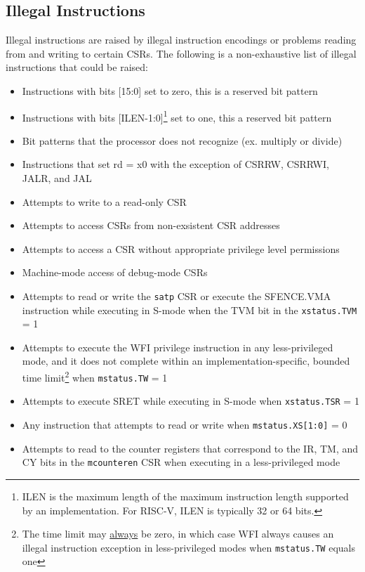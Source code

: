 \documentclass[12pt]{article}
\begin{document}
\subsection{Illegal Instructions}
Illegal instructions are raised by illegal instruction encodings or problems reading from and writing to certain CSRs. The following is a non-exhaustive list of illegal instructions that could be raised:
\begin{itemize}
    \item Instructions with bits [15:0] set to zero, this is a reserved bit pattern
    \item Instructions with bits [ILEN-1:0]\footnote[2]{ILEN is the maximum length of the maximum instruction length supported by an implementation. For RISC-V, ILEN is typically 32 or 64 bits.} set to one, this a reserved bit pattern 
    \item Bit patterns that the processor does not recognize (ex. multiply or divide)
    \item Instructions that set rd = x0 with the exception of CSRRW, CSRRWI, JALR, and JAL
    \item Attempts to write to a read-only CSR 
    \item Attempts to access CSRs from non-exsistent CSR addresses
    \item Attempts to access a CSR without appropriate privilege level permissions 
    \item Machine-mode access of debug-mode CSRs
    \item Attempts to read or write the {\tt{satp}} CSR or execute the SFENCE.VMA instruction while executing in S-mode when the TVM bit in the {\tt{xstatus.TVM}} = 1
    \item Attempts to execute the WFI privilege instruction in any less-privileged mode, and it does not complete within an implementation-specific, bounded time limit\footnote[3]{The time limit may \underline{always} be zero, in which case WFI always causes an illegal instruction exception in less-privileged modes when {\tt{mstatus.TW}} equals one} when {\tt{mstatus.TW}} = 1
    \item Attempts to execute SRET while executing in S-mode when {\tt{xstatus.TSR}} = 1
    \item Any instruction that attempts to read or write when {\tt{mstatus.XS[1:0]}} = 0
    \item Attempts to read to the counter registers that correspond to the IR, TM, and CY bits in the {\tt{mcounteren}} CSR when executing in a less-privileged mode 
\end{itemize}
\end{document}
